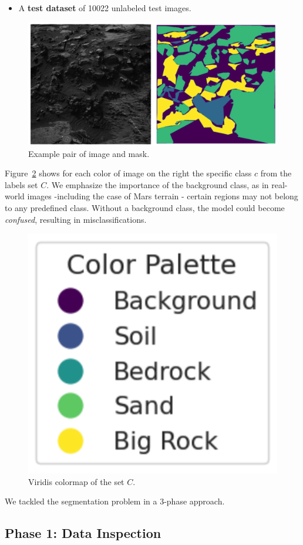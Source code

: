 \documentclass[11pt]{article}
\begin{document}
\begin{multicols*}{2}
\begin{itemize}
        \item A \textbf{test dataset} of 10022 unlabeled test images.
    \end{itemize}

    \begin{figure}[H]
            \centering
            \includegraphics[width=0.85\linewidth]{figures/mars1.png}
            \caption{Example pair of image and mask.}
            \label{fig:mars1}
    \end{figure}

    \noindent Figure~\ref{fig:palette} shows for each color of image on the right the specific class $c$ from the labels set $C$. We emphasize the importance of the background class, as in real-world images -including the case of Mars terrain - certain regions may not belong to any predefined class. Without a background class, the model could become \emph{confused}, resulting in misclassifications.
    
    \begin{figure}[H]
            \centering
            \includegraphics[width=0.35\linewidth]{figures/mars_palette.png}
            \caption{Viridis colormap of the set $C$.}
            \label{fig:palette}
    \end{figure}
    
    \noindent We tackled the segmentation problem in a 3-phase approach.

    \subsection{Phase 1: Data Inspection}


\end{multicols*}
\end{document}
